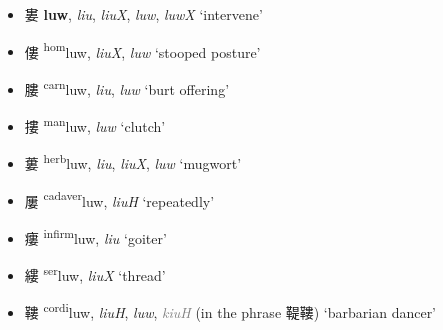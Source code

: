 


\begin{itemize}
    \item {\Large{婁}}  %
    {\large{\textbf{luw}}},
    \textit{liu}, \textit{liuX}, \textit{luw}, \textit{luwX} `intervene' %

    \item {\Large{僂}}  %
    {\large{{\textsuperscript{hom}}luw}},
    \textit{liuX}, \textit{luw} `stooped posture' %

    \item {\Large{膢}}  %
    {\large{{\textsuperscript{carn}}luw}},
    \textit{liu}, \textit{luw} `burt offering' %

    \item {\Large{摟}}  %
    {\large{{\textsuperscript{man}}luw}},
    \textit{luw} `clutch' %

    \item {\Large{蔞}}  %
    {\large{{\textsuperscript{herb}}luw}},
    \textit{liu}, \textit{liuX}, \textit{luw} `mugwort' %

    \item {\Large{屢}}  %
    {\large{{\textsuperscript{cadaver}}luw}},
    \textit{liuH} `repeatedly' %

    \item {\Large{瘻}}  %
    {\large{{\textsuperscript{infirm}}luw}},
    \textit{liu} `goiter' %

    \item {\Large{縷}}  %
    {\large{{\textsuperscript{ser}}luw}},
    \textit{liuX} `thread' %

    \item {\Large{鞻}}  %
    {\large{{\textsuperscript{cordi}}luw}},
\textit{liuH}, \textit{luw}, 
\textcolor{gray}{\textit{kiuH}}%
(in the phrase 鞮鞻) `barbarian dancer'


\end{itemize}
